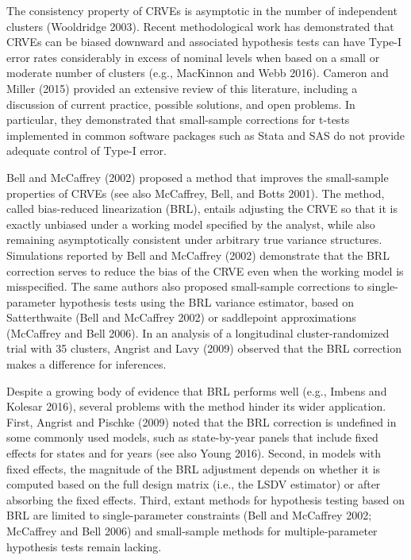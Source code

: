 \documentclass[12pt]{article}
\begin{document}
The consistency property of CRVEs is asymptotic in the number of
independent clusters (Wooldridge 2003). Recent methodological work has
demonstrated that CRVEs can be biased downward and associated hypothesis
tests can have Type-I error rates considerably in excess of nominal
levels when based on a small or moderate number of clusters (e.g.,
MacKinnon and Webb 2016). Cameron and Miller (2015) provided an
extensive review of this literature, including a discussion of current
practice, possible solutions, and open problems. In particular, they
demonstrated that small-sample corrections for t-tests implemented in
common software packages such as Stata and SAS do not provide adequate
control of Type-I error.

Bell and McCaffrey (2002) proposed a method that improves the
small-sample properties of CRVEs (see also McCaffrey, Bell, and Botts
2001). The method, called bias-reduced linearization (BRL), entails
adjusting the CRVE so that it is exactly unbiased under a working model
specified by the analyst, while also remaining asymptotically consistent
under arbitrary true variance structures. Simulations reported by Bell
and McCaffrey (2002) demonstrate that the BRL correction serves to
reduce the bias of the CRVE even when the working model is misspecified.
The same authors also proposed small-sample corrections to
single-parameter hypothesis tests using the BRL variance estimator,
based on Satterthwaite (Bell and McCaffrey 2002) or saddlepoint
approximations (McCaffrey and Bell 2006). In an analysis of a
longitudinal cluster-randomized trial with 35 clusters, Angrist and Lavy
(2009) observed that the BRL correction makes a difference for
inferences.

Despite a growing body of evidence that BRL performs well (e.g., Imbens
and Kolesar 2016), several problems with the method hinder its wider
application. First, Angrist and Pischke (2009) noted that the BRL
correction is undefined in some commonly used models, such as
state-by-year panels that include fixed effects for states and for years
(see also Young 2016). Second, in models with fixed effects, the
magnitude of the BRL adjustment depends on whether it is computed based
on the full design matrix (i.e., the LSDV estimator) or after absorbing
the fixed effects. Third, extant methods for hypothesis testing based on
BRL are limited to single-parameter constraints (Bell and McCaffrey
2002; McCaffrey and Bell 2006) and small-sample methods for
multiple-parameter hypothesis tests remain lacking.
\end{document}
